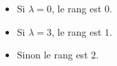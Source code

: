 \begin{itemize}
 \item Si $\lambda=0$, le rang est $0$.
 \item Si $\lambda=3$, le rang est $1$.
 \item Sinon le rang est $2$.
\end{itemize}

